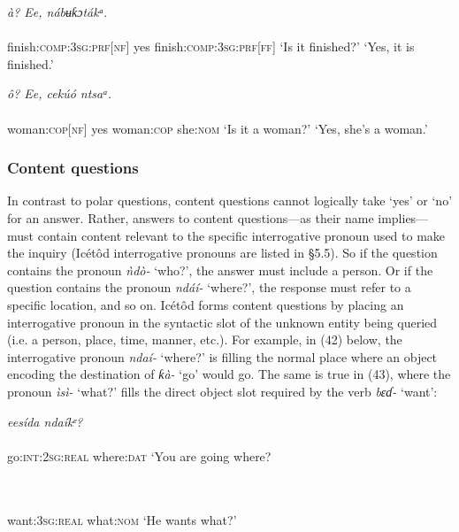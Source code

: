\ea\label{ex:}
\textit{à}\textit{?      Ee, nábʉƙɔtá}\textit{kᵃ}. \\
    \\
finish:\textsc{comp:3sg:prf}[\textsc{nf}]  yes finish:\textsc{comp:3sg:prf[ff]}
\glt ‘Is it finished?’    ‘Yes, it is finished.’ 
\z




\ea\label{ex:}
\textit{ô}\textit{?      Ee, cekúó     ntsaᵃ.} \\
    \\
woman:\textsc{cop[nf]}    yes woman:\textsc{cop}   she:\textsc{nom}
\glt ‘Is it a woman?’    ‘Yes, she’s a woman.’ 
\z




\subsubsection{Content questions}

In contrast to polar questions, content questions cannot logically take ‘yes’ or ‘no’ for an answer. Rather, answers to content questions—as their name implies—must contain content relevant to the specific interrogative pronoun used to make the inquiry (Icétôd interrogative pronouns are listed in §5.5). So if the question contains the pronoun \textit{ǹdò-} ‘who?’, the answer must include a person. Or if the question contains the pronoun \textit{ndáí-} ‘where?’, the response must refer to a specific location, and so on. Icétôd forms content questions by placing an interrogative pronoun in the syntactic slot of the unknown entity being queried (i.e. a person, place, time, manner, etc.). For example, in (42) below, the interrogative pronoun \textit{ndaí-} ‘where?’ is filling the normal place where an object encoding the destination of \textit{ƙà-} ‘go’ would go. The same is true in (43), where the pronoun \textit{ìsì-} ‘what?’ fills the direct object slot required by the verb \textit{bɛɗ-} ‘want’:




\ea\label{ex:}
\textit{eesída     ndaíkᵉ?} \\
    \\
go:\textsc{int:2sg:real}   where:\textsc{dat}
\glt ‘You are going where? 
\z




\ea\label{ex:}
 \\
    \\
want:\textsc{3sg:real}   what:\textsc{nom}
\glt ‘He wants what?’ 
\z


